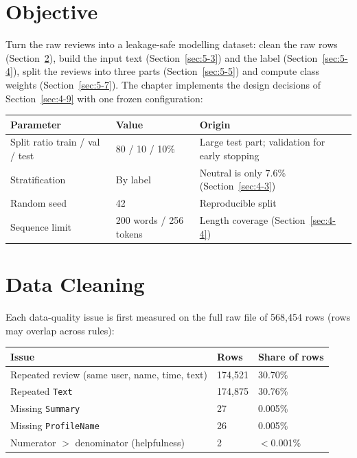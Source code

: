 \section{Objective}
\label{sec:5-1}

Turn the raw reviews into a leakage-safe modelling dataset: clean the raw rows (Section~\ref{sec:5-2}), build the input text (Section~\ref{sec:5-3}) and the label (Section~\ref{sec:5-4}), split the reviews into three parts (Section~\ref{sec:5-5}) and compute class weights (Section~\ref{sec:5-7}). The chapter implements the design decisions of Section~\ref{sec:4-9} with one frozen configuration:

\begin{center}
\begin{tabular}{@{}p{5.2cm}p{3cm}p{5.8cm}@{}}
    \toprule
    Parameter & Value & Origin \\
    \midrule
    Split ratio train / val / test & 80 / 10 / 10\% & Large test part; validation for early stopping \\
    Stratification & By label & Neutral is only 7.6\% (Section~\ref{sec:4-3}) \\
    Random seed & 42 & Reproducible split \\
    Sequence limit & 200 words / 256 tokens & Length coverage (Section~\ref{sec:4-4}) \\
    \bottomrule
\end{tabular}
\end{center}

\section{Data Cleaning}
\label{sec:5-2}

Each data-quality issue is first measured on the full raw file of 568{,}454 rows (rows may overlap across rules):

\begin{center}
\begin{tabular}{@{}p{7cm}p{3cm}p{3cm}@{}}
    \toprule
    Issue & Rows & Share of rows \\
    \midrule
    Repeated review (same user, name, time, text) & 174{,}521 & 30.70\% \\
    Repeated \texttt{Text} & 174{,}875 & 30.76\% \\
    Missing \texttt{Summary} & 27 & 0.005\% \\
    Missing \texttt{ProfileName} & 26 & 0.005\% \\
    Numerator $>$ denominator (helpfulness) & 2 & $<$0.001\% \\
    \bottomrule
\end{tabular}
\end{center}


